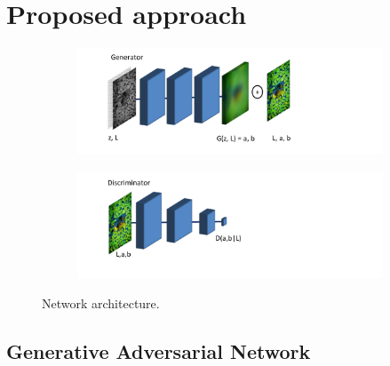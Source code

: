 \documentclass[10pt,twocolumn,letterpaper]{article}
\begin{document}
\section{Proposed approach}
\begin{figure} [t!]
    \centering
    \begin{subfigure}[b]{0.48\textwidth}
        \includegraphics[trim=30 20 150 0, clip,width=\textwidth]{img/Generator.pdf}
    \end{subfigure}
    \begin{subfigure}[b]{0.48\textwidth}
        \includegraphics[trim=30 20 150 0, clip,width=\textwidth]{img/Discriminator.pdf}
    \end{subfigure}
    \vspace{-0.16in}
    \caption{\small Network architecture.}
    \vspace{-0.2in}
   \label{fig:concept}
\end{figure}


\subsection{Generative Adversarial Network} 
\end{document}
